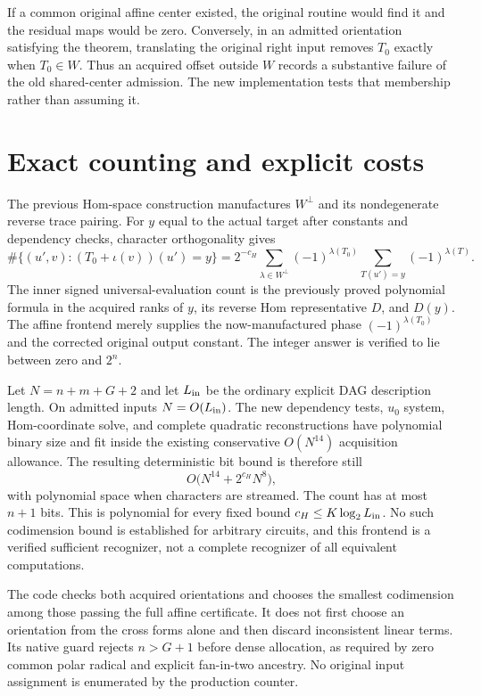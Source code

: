 \documentclass[11pt]{article}
\begin{document}
If a common original affine center existed, the original routine would
find it and the residual maps would be zero. Conversely, in an admitted
orientation satisfying the theorem, translating the original right
input removes $T_0$ exactly when $T_0\in W$. Thus an acquired offset
outside $W$ records a substantive failure of the old shared-center
admission. The new implementation tests that membership rather than
assuming it.

\section{Exact counting and explicit costs}

The previous Hom-space construction manufactures $W^\perp$ and its
nondegenerate reverse trace pairing. For $y$ equal to the actual target
after constants and dependency checks, character orthogonality gives
\[
 \#\{(u',v):(T_0+\iota(v))(u')=y\}
 =2^{-c_H}\sum_{\lambda\in W^\perp}
   (-1)^{\lambda(T_0)}
   \sum_{T(u')=y}(-1)^{\lambda(T)}.
\]
The inner signed universal-evaluation count is the previously proved
polynomial formula in the acquired ranks of $y$, its reverse Hom
representative $D$, and $D(y)$. The affine frontend merely supplies the
now-manufactured phase $(-1)^{\lambda(T_0)}$ and the corrected original
output constant. The integer answer is verified to lie between zero
and $2^n$.

Let $N=n+m+G+2$ and let $L_{\rm in}$ be the ordinary explicit DAG
description length. On admitted inputs $N=O(L_{\rm in})$. The new
dependency tests, $u_0$ system, Hom-coordinate solve, and complete
quadratic reconstructions have polynomial binary size and fit inside
the existing conservative $O(N^{14})$ acquisition allowance. The
resulting deterministic bit bound is therefore still
\[
 O\bigl(N^{14}+2^{c_H}N^8\bigr),
\]
with polynomial space when characters are streamed. The count has at
most $n+1$ bits. This is polynomial for every fixed bound
$c_H\leq K\log_2 L_{\rm in}$. No such codimension bound is established
for arbitrary circuits, and this frontend is a verified sufficient
recognizer, not a complete recognizer of all equivalent computations.

The code checks both acquired orientations and chooses the smallest
codimension among those passing the full affine certificate. It does
not first choose an orientation from the cross forms alone and then
discard inconsistent linear terms. Its native guard rejects
$n>G+1$ before dense allocation, as required by zero common polar
radical and explicit fan-in-two ancestry. No original input assignment
is enumerated by the production counter.
\end{document}

